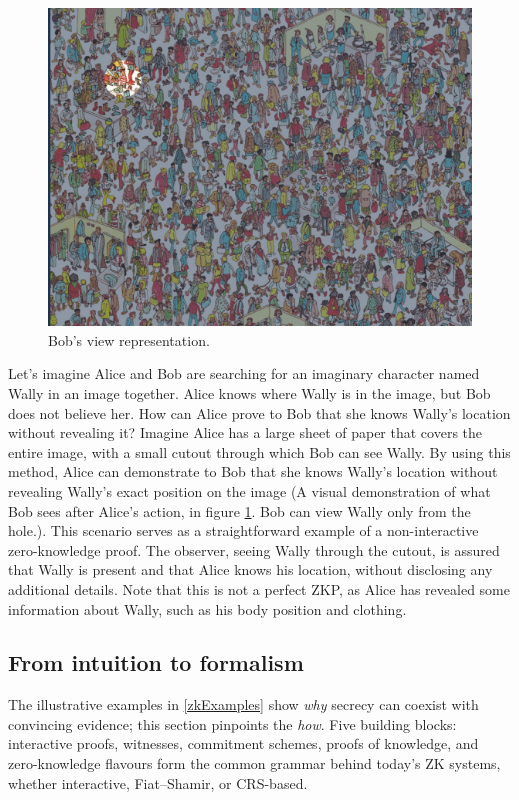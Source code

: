 \begin{figure}[h]
    \centering
    \includegraphics[width=0.7\linewidth]{Images/Chap1/bobsview.png}
    \caption{Bob's view representation.}
    \label{fig:bobsview}
\end{figure}
Let's imagine Alice and Bob are searching for an imaginary character named Wally in an image together. Alice knows where Wally is in the image, but Bob does not believe her. How can Alice prove to Bob that she knows Wally's location without revealing it? Imagine Alice has a large sheet of paper that covers the entire image, with a small cutout through which Bob can see Wally. By using this method, Alice can demonstrate to Bob that she knows Wally's location without revealing Wally's exact position on the image (A visual demonstration of what Bob sees after Alice's action, in figure \ref{fig:bobsview}. Bob can view Wally only from the hole.).
This scenario serves as a straightforward example of a non-interactive zero-knowledge proof. The observer, seeing Wally through the cutout, is assured that Wally is present and that Alice knows his location, without disclosing any additional details. Note that this is not a perfect ZKP, as Alice has revealed some information about Wally, such as his body position and clothing.

\subsection{From intuition to formalism}\label{Chap2.3.transition}
The illustrative examples in \ref{zkExamples} show \emph{why} secrecy can coexist with convincing evidence; this section pinpoints the \emph{how}. Five building blocks: interactive proofs, witnesses, commitment schemes, proofs of knowledge, and zero-knowledge flavours form the common grammar behind today’s ZK systems, whether interactive, Fiat–Shamir, or CRS-based.

